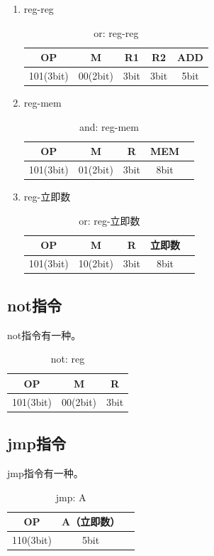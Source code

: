 \documentclass[UTF8]{ctexrep}
\begin{document}
\begin{enumerate}
\item reg-reg
\begin{table}[H]
\centering
\begin{tabular}{|c|c|c|c|c|}
\hline
OP        & M        & R1   & R2   & ADD  \\ \hline
101(3bit) & 00(2bit) & 3bit & 3bit & 5bit \\ \hline
\end{tabular}
\caption{or: reg-reg}
\label{tab:16}
\end{table}

\item reg-mem
\begin{table}[H]
\centering
\begin{tabular}{|c|c|c|c|c|}
\hline
OP        & M        & R    & MEM  \\ \hline
101(3bit) & 01(2bit) & 3bit & 8bit \\ \hline
\end{tabular}
\caption{and: reg-mem}
\label{tab:17}
\end{table}

\item reg-立即数
\begin{table}[H]
\centering
\begin{tabular}{|c|c|c|c|c|}
\hline
OP        & M        & R    & 立即数  \\ \hline
101(3bit) & 10(2bit) & 3bit & 8bit \\ \hline
\end{tabular}
\caption{or: reg-立即数}
\label{tab:18}
\end{table}

\end{enumerate}

\subsection{not指令}
not指令有一种。
\begin{table}[H]
\centering
\begin{tabular}{|c|c|c|}
\hline
OP        & M        & R    \\ \hline
101(3bit) & 00(2bit) & 3bit \\ \hline
\end{tabular}
\caption{not: reg}
\label{tab:19}
\end{table}

\subsection{jmp指令}
jmp指令有一种。
\begin{table}[H]
\centering
\begin{tabular}{|c|c|c|}
\hline
OP        & A（立即数） \\ \hline
110(3bit) & 5bit   \\ \hline
\end{tabular}
\caption{jmp: A}
\label{tab:20}
\end{table}
\end{document}
